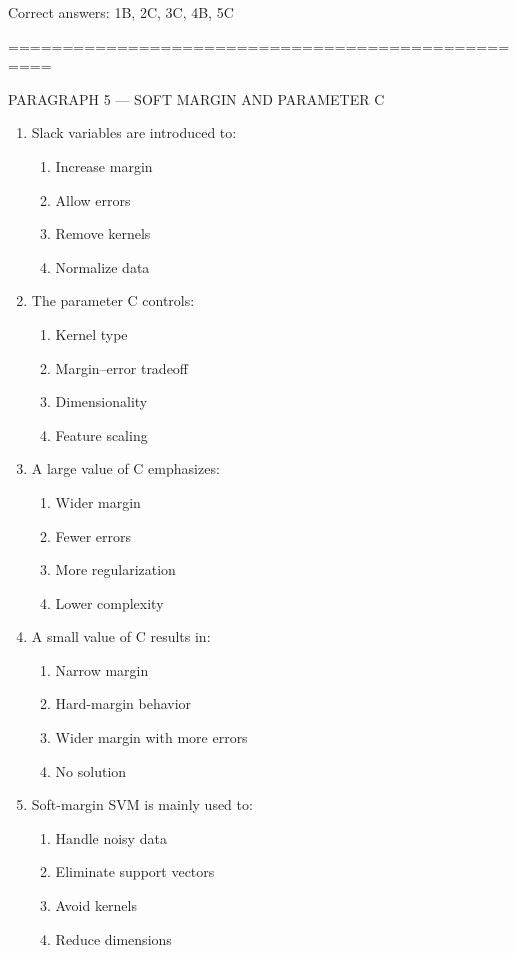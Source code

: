 \documentclass{article}
\begin{document}
	Correct answers: 1B, 2C, 3C, 4B, 5C
	
	\bigskip
	==================================================
	
	PARAGRAPH 5 — SOFT MARGIN AND PARAMETER C
	
	\begin{enumerate}
		\item Slack variables are introduced to:
		\begin{enumerate}
			\item Increase margin
			\item Allow errors
			\item Remove kernels
			\item Normalize data
		\end{enumerate}
		
		\item The parameter C controls:
		\begin{enumerate}
			\item Kernel type
			\item Margin–error tradeoff
			\item Dimensionality
			\item Feature scaling
		\end{enumerate}
		
		\item A large value of C emphasizes:
		\begin{enumerate}
			\item Wider margin
			\item Fewer errors
			\item More regularization
			\item Lower complexity
		\end{enumerate}
		
		\item A small value of C results in:
		\begin{enumerate}
			\item Narrow margin
			\item Hard-margin behavior
			\item Wider margin with more errors
			\item No solution
		\end{enumerate}
		
		\item Soft-margin SVM is mainly used to:
		\begin{enumerate}
			\item Handle noisy data
			\item Eliminate support vectors
			\item Avoid kernels
			\item Reduce dimensions
		\end{enumerate}
	\end{enumerate}
	
\end{document}
